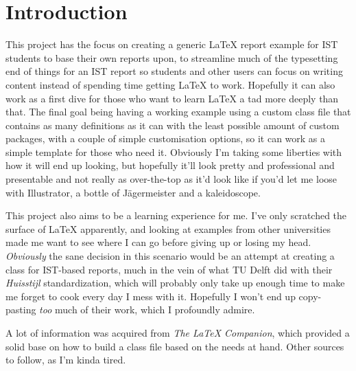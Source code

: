 \documentclass{ist-report}
\begin{document}

\section{Introduction}

This project has the focus on creating a generic \LaTeX{} report example for IST students to base their own reports upon, to streamline much of the typesetting end of things for an IST report so students and other users can focus on writing content instead of spending time getting \LaTeX{} to work. Hopefully it can also work as a first dive for those who want to learn \LaTeX{} a tad more deeply than that. The final goal being having a working example using a custom class file that contains as many definitions as it can with the least possible amount of custom packages, with a couple of simple customisation options, so it can work as a simple template for those who need it. Obviously I'm taking some liberties with how it will end up looking, but hopefully it'll look pretty and professional and presentable and not really as over-the-top as it'd look like if you'd let me loose with Illustrator, a bottle of Jägermeister and a kaleidoscope.

This project also aims to be a learning experience for me. I've only scratched the surface of \LaTeX{} apparently, and looking at examples from other universities made me want to see where I can go before giving up or losing my head. \emph{Obviously} the sane decision in this scenario would be an attempt at creating a class for IST-based reports, much in the vein of what TU Delft did with their \textit{Huisstijl} standardization, which will probably only take up enough time to make me forget to cook every day I mess with it. Hopefully I won't end up copy-pasting \emph{too} much of their work, which I profoundly admire.

A lot of information was acquired from \textit{The \LaTeX{} Companion}\cite{latex-companion}, which provided a solid base on how to build a class file based on the needs at hand. Other sources to follow, as I'm kinda tired.

\printbibliography
\end{document}

